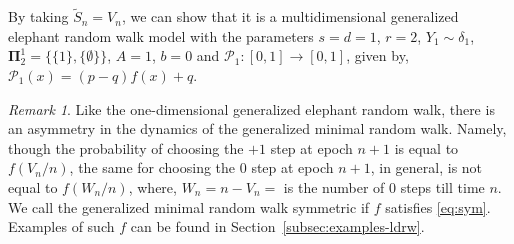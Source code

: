 \documentclass[12pt]{amsart}
\theoremstyle{plain}
\theoremstyle{remark}
\newtheorem{remark}[theorem]{Remark}
\numberwithin{equation}{section}
\begin{document}
By taking $\widetilde{S}_n = V_n$, we can show that it is a multidimensional generalized elephant random walk model with the parameters $s = d = 1$, $r = 2$, ${Y}_1 \sim \delta_{{1}}$, $\boldsymbol{\Pi}^1_2 = \{\{1\}, \{\emptyset\}\}$, ${A} = 1$, ${b} = 0$ and ${\mathcal{P}_1} : [0,1] \to [0,1]$, given by, $\mathcal{P}_1(x) = (p-q)f(x) + q$.

\begin{remark}
Like the one-dimensional generalized elephant random walk, there is an asymmetry in the dynamics of the generalized minimal random walk. Namely, though the probability of choosing the $+1$ step at epoch $n + 1$ is equal to $f(V_n/n)$, the same for choosing the $0$ step at epoch $n + 1$, in general, is not equal to $f(W_n/n)$, where, $W_n = n - V_n = $ is the number of $0$ steps till time $n$. We call the generalized minimal random walk symmetric if $f$ satisfies \eqref{eq:sym}. Examples of such $f$ can be found in Section~\ref{subsec:examples-ldrw}.   
\end{remark}
\end{document}
